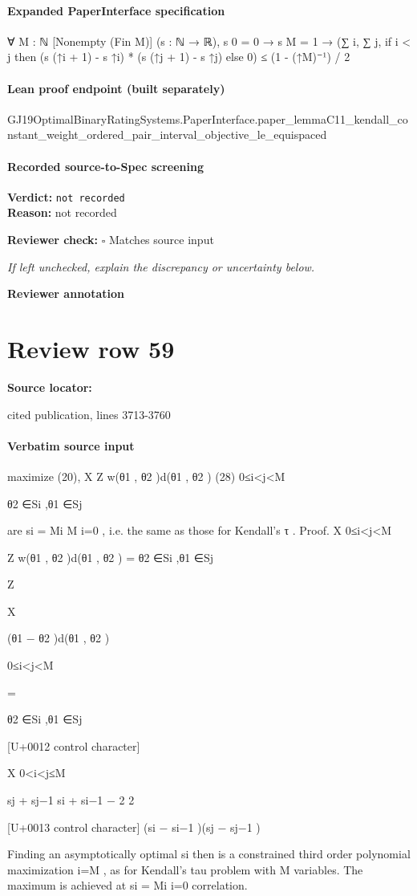 \documentclass[10pt]{article}
\newcommand{\reviewerbox}{%
  \par\noindent\fbox{\parbox{0.96\linewidth}{\rule{0pt}{0.38in}}}\par
}
\newcommand{\reviewmatch}[1]{%
  \par\noindent\textbf{Reviewer check:} $\square$\; #1\par
  \noindent\emph{If left unchecked, explain the discrepancy or uncertainty below.}\par
}
\begin{document}
\paragraph{Expanded PaperInterface specification}
\begin{ReviewVerbatim}
∀ {M : ℕ} [Nonempty (Fin M)] (s : ℕ → ℝ),
  s 0 = 0 → s M = 1 → (∑ i, ∑ j, if i < j then (s (↑i + 1) - s ↑i) * (s (↑j + 1) - s ↑j) else 0) ≤ (1 - (↑M)⁻¹) / 2
\end{ReviewVerbatim}

\paragraph{Lean proof endpoint (built separately)}\begin{ReviewVerbatim}
GJ19OptimalBinaryRatingSystems.PaperInterface.paper_lemmaC11_kendall_constant_weight_ordered_pair_interval_objective_le_equispaced
\end{ReviewVerbatim}

\paragraph{Recorded source-to-Spec screening}
\textbf{Verdict:} \texttt{not recorded}
\\
\textbf{Reason:} not recorded
\reviewmatch{Matches source input}
\noindent\textbf{Reviewer annotation}\par
\reviewerbox
\clearpage
\hypertarget{source-claim-9e5abbd5563b8516}{}
\section*{Review row 59}
\textbf{Source locator:} {\footnotesize\raggedright cited publication, lines 3713-\allowbreak{}3760\par}
\paragraph{Verbatim source input}
\begin{ReviewVerbatim}
maximize (20),
X Z
w(θ1 , θ2 )d(θ1 , θ2 )
(28)
0≤i<j<M

θ2 ∈Si ,θ1 ∈Sj

are {si = Mi }M
i=0 , i.e. the same as those for Kendall’s τ .
Proof.
X
0≤i<j<M

Z
w(θ1 , θ2 )d(θ1 , θ2 ) =
θ2 ∈Si ,θ1 ∈Sj

Z

X

(θ1 − θ2 )d(θ1 , θ2 )

0≤i<j<M

=

θ2 ∈Si ,θ1 ∈Sj

[U+0012 control character]

X
0<i<j≤M

sj + sj−1 si + si−1
−
2
2

[U+0013 control character]
(si − si−1 )(sj − sj−1 )

Finding an asymptotically optimal {si } then is a constrained third order polynomial maximization
i=M , as for Kendall’s tau
problem with M variables. The maximum is achieved at {si = Mi }i=0
correlation.
\end{ReviewVerbatim}
\end{document}

